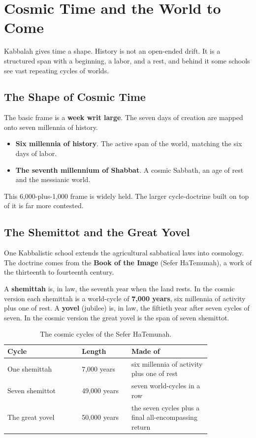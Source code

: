 \section{Cosmic Time and the World to Come}

Kabbalah gives time a shape. History is not an open-ended drift. It is a
structured span with a beginning, a labor, and a rest, and behind it some schools
see vast repeating cycles of worlds.

\subsection{The Shape of Cosmic Time}

The basic frame is a \textbf{week writ large}. The seven days of creation are
mapped onto seven millennia of history.

\begin{itemize}
 \item \textbf{Six millennia of history}. The active span of the world, matching
 the six days of labor.
 \item \textbf{The seventh millennium of Shabbat}. A cosmic Sabbath, an age of
 rest and the messianic world.
\end{itemize}

This 6,000-plus-1,000 frame is widely held. The larger cycle-doctrine built on top
of it is far more contested.

\subsection{The Shemittot and the Great Yovel}

One Kabbalistic school extends the agricultural sabbatical laws into cosmology.
The doctrine comes from the \textbf{Book of the Image} (Sefer HaTemunah), a
work of the thirteenth to fourteenth century.

A \textbf{shemittah} is, in law, the seventh year when the land rests. In the
cosmic version each shemittah is a world-cycle of \textbf{7,000 years}, six
millennia of activity plus one of rest. A \textbf{yovel} (jubilee) is, in law, the
fiftieth year after seven cycles of seven. In the cosmic version the great yovel
is the span of seven shemittot.

\begin{longtable}{L{0.30\linewidth} L{0.20\linewidth} L{0.32\linewidth}}
\caption{The cosmic cycles of the Sefer HaTemunah.}\\
\toprule
\textbf{Cycle} & \textbf{Length} & \textbf{Made of} \\
\midrule
One shemittah & 7,000 years & six millennia of activity plus one of rest \\
Seven shemittot & 49,000 years & seven world-cycles in a row \\
The great yovel & 50,000 years & the seven cycles plus a final all-encompassing return \\
\bottomrule
\end{longtable}

